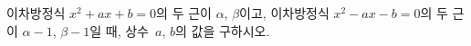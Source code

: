 이차방정식 $x^2+ax+b=0$의 두 근이 $\alpha$, $\beta$이고, 이차방정식 $x^2-ax-b=0$의 두 근이 $\alpha-1$, $\beta-1$일 때, 상수~$a$, $b$의 값을 구하시오.

